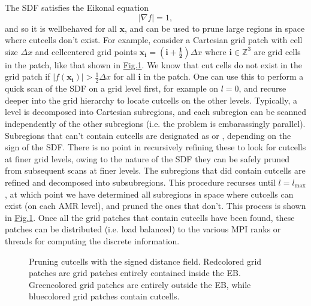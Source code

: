 \documentclass[letterpaper,10pt,english]{sphinxmanual}
\let\sphinxpxdimen\pdfpxdimen\else\newdimen\sphinxpxdimen
\begin{document}
The SDF satisfies the Eikonal equation
\begin{equation}
\left|\nabla f\right| = 1,
\end{equation}
and so it is well\sphinxhyphen{}behaved for all \(\mathbf{x}\), and can be used to prune large regions in space where cut\sphinxhyphen{}cells don’t exist.
For example, consider a Cartesian grid patch with cell size \(\Delta x\) and cell\sphinxhyphen{}centered grid points \(\mathbf{x}_{\mathbf{i}} = \left(\mathbf{i} + \mathbf{\frac{1}{2}}\right)\Delta x\) where \(\mathbf{i} \in \mathbb{Z}^3\) are grid cells in the patch, like that shown in \hyperref[\detokenize{Source/SpatialDiscretization:fig-pruning}]{Fig.\@ \ref{\detokenize{Source/SpatialDiscretization:fig-pruning}}}.
We know that cut cells do not exist in the grid patch if \(\left|f\left(\mathbf{x}_{\mathbf{i}}\right)\right| > \frac{1}{2}\Delta x\) for all \(\mathbf{i}\) in the patch.
One can use this to perform a quick scan of the SDF on a  grid level first, for example on \(l=0\), and recurse deeper into the grid hierarchy to locate cut\sphinxhyphen{}cells on the other levels.
Typically, a level is decomposed into Cartesian subregions, and each subregion can be scanned independently of the other subregions (i.e. the problem is embarassingly parallel).
Subregions that can’t contain cut\sphinxhyphen{}cells are designated as  or , depending on the sign of the SDF.
There is no point in recursively refining these to look for cut\sphinxhyphen{}cells at finer grid levels, owing to the nature of the SDF they can be safely pruned from subsequent scans at finer levels.
The subregions that did contain cut\sphinxhyphen{}cells are refined and decomposed into sub\sphinxhyphen{}subregions.
This procedure recurses until \(l=l_{\text{max}}\), at which point we have determined all sub\sphinxhyphen{}regions in space where cut\sphinxhyphen{}cells can exist (on each AMR level), and pruned the ones that don’t.
This process is shown in \hyperref[\detokenize{Source/SpatialDiscretization:fig-pruning}]{Fig.\@ \ref{\detokenize{Source/SpatialDiscretization:fig-pruning}}}.
Once all the grid patches that contain cut\sphinxhyphen{}cells have been found, these patches can be distributed (i.e. load balanced) to the various MPI ranks or threads for computing the discrete information.

\begin{figure}[htb]
\centering
\capstart

\noindent\sphinxincludegraphics[width=600\sphinxpxdimen]{{Pruning}.png}
\caption{Pruning cut\sphinxhyphen{}cells with the signed distance field.
Red\sphinxhyphen{}colored grid patches are grid patches entirely contained inside the EB.
Green\sphinxhyphen{}colored grid patches are entirely outside the EB, while blue\sphinxhyphen{}colored grid patches contain cut\sphinxhyphen{}cells.}\label{\detokenize{Source/SpatialDiscretization:id5}}\label{\detokenize{Source/SpatialDiscretization:fig-pruning}}\end{figure}
\end{document}
